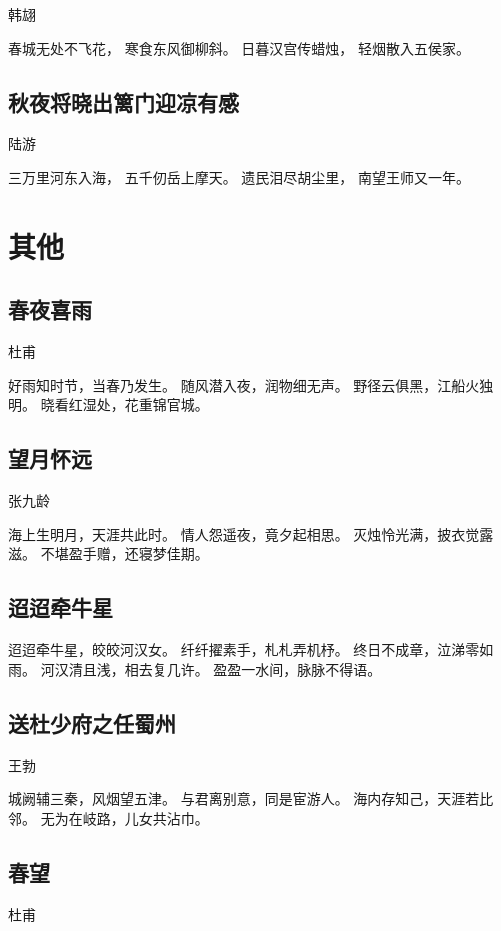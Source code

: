 \documentclass[12pt,UTF8]{ctexbook}
\begin{document}
韩翃

春城无处不飞花，
寒食东风御柳斜。
日暮汉宫传蜡烛，
轻烟散入五侯家。

\section{秋夜将晓出篱门迎凉有感}

陆游

三万里河东入海，
五千仞岳上摩天。
遗民泪尽胡尘里，
南望王师又一年。

\chapter{其他}

\section{春夜喜雨} 

杜甫 

好雨知时节，当春乃发生。
随风潜入夜，润物细无声。
野径云俱黑，江船火独明。
晓看红湿处，花重锦官城。

\section{望月怀远}

张九龄

海上生明月，天涯共此时。
情人怨遥夜，竟夕起相思。
灭烛怜光满，披衣觉露滋。
不堪盈手赠，还寝梦佳期。

\section{迢迢牵牛星}

迢迢牵牛星，皎皎河汉女。
纤纤擢素手，札札弄机杼。
终日不成章，泣涕零如雨。
河汉清且浅，相去复几许。
盈盈一水间，脉脉不得语。

\section{送杜少府之任蜀州}

王勃

城阙辅三秦，风烟望五津。
与君离别意，同是宦游人。
海内存知己，天涯若比邻。
无为在岐路，儿女共沾巾。

\section{春望}

杜甫
\end{document}

